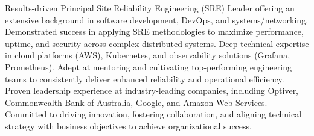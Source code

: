 

\begin{cvparagraph}
Results-driven Principal Site Reliability Engineering (SRE) Leader offering an extensive background in software development, DevOps, and systems/networking. Demonstrated success in applying SRE methodologies to maximize performance, uptime, and security across complex distributed systems. Deep technical expertise in cloud platforms (AWS), Kubernetes, and observability solutions (Grafana, Prometheus). Adept at mentoring and cultivating top-performing engineering teams to consistently deliver enhanced reliability and operational efficiency. Proven leadership experience at industry-leading companies, including Optiver, Commonwealth Bank of Australia, Google, and Amazon Web Services. Committed to driving innovation, fostering collaboration, and aligning technical strategy with business objectives to achieve organizational success.
\end{cvparagraph}
